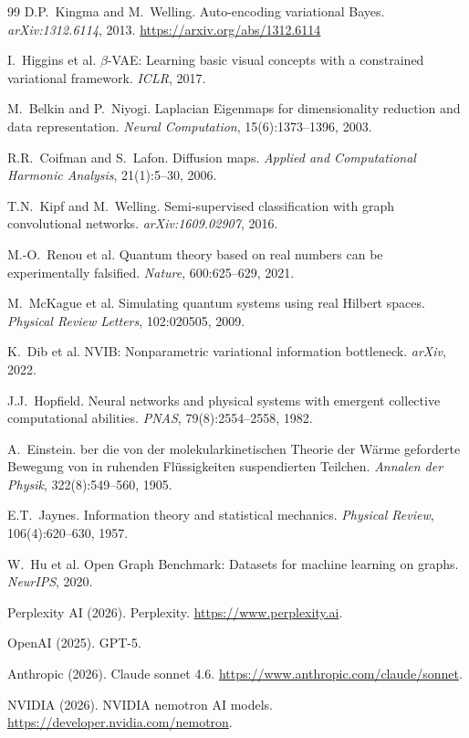 \documentclass[11pt,a4paper]{article}
\begin{document}
\begin{thebibliography}{99}
D.P.\ Kingma and M.\ Welling.
\newblock Auto-encoding variational Bayes.
\newblock \emph{arXiv:1312.6114}, 2013.
\newblock \url{https://arxiv.org/abs/1312.6114}

I.\ Higgins et al.
\newblock $\beta$-VAE: Learning basic visual concepts with a constrained
  variational framework.
\newblock \emph{ICLR}, 2017.

M.\ Belkin and P.\ Niyogi.
\newblock Laplacian Eigenmaps for dimensionality reduction and data
  representation.
\newblock \emph{Neural Computation}, 15(6):1373--1396, 2003.

R.R.\ Coifman and S.\ Lafon.
\newblock Diffusion maps.
\newblock \emph{Applied and Computational Harmonic Analysis}, 21(1):5--30, 2006.

T.N.\ Kipf and M.\ Welling.
\newblock Semi-supervised classification with graph convolutional networks.
\newblock \emph{arXiv:1609.02907}, 2016.

M.-O.\ Renou et al.
\newblock Quantum theory based on real numbers can be experimentally falsified.
\newblock \emph{Nature}, 600:625--629, 2021.

M.\ McKague et al.
\newblock Simulating quantum systems using real Hilbert spaces.
\newblock \emph{Physical Review Letters}, 102:020505, 2009.

K.\ Dib et al.
\newblock NVIB: Nonparametric variational information bottleneck.
\newblock \emph{arXiv}, 2022.

J.J.\ Hopfield.
\newblock Neural networks and physical systems with emergent collective
  computational abilities.
\newblock \emph{PNAS}, 79(8):2554--2558, 1982.

A.\ Einstein.
ber die von der molekularkinetischen Theorie der W{\"a}rme
  geforderte Bewegung von in ruhenden Fl{\"u}ssigkeiten suspendierten Teilchen.
\newblock \emph{Annalen der Physik}, 322(8):549--560, 1905.

E.T.\ Jaynes.
\newblock Information theory and statistical mechanics.
\newblock \emph{Physical Review}, 106(4):620--630, 1957.

W.\ Hu et al.
\newblock Open Graph Benchmark: Datasets for machine learning on graphs.
\newblock \emph{NeurIPS}, 2020.

Perplexity AI (2026).
\newblock Perplexity.
\newblock \url{https://www.perplexity.ai}.

OpenAI (2025).
\newblock GPT-5.

Anthropic (2026).
\newblock Claude sonnet 4.6.
\newblock \url{https://www.anthropic.com/claude/sonnet}.

NVIDIA (2026).
\newblock NVIDIA nemotron AI models.
\newblock \url{https://developer.nvidia.com/nemotron}.

\end{thebibliography}
\end{document}
